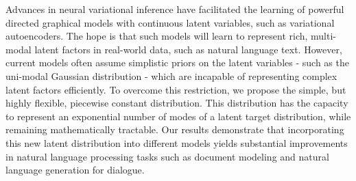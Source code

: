 Advances in neural variational inference have facilitated the learning of powerful directed graphical models with continuous latent variables, such as variational autoencoders. The hope is that such models will learn to represent rich, multi-modal latent factors in real-world data, such as natural language text. However, current models often assume simplistic priors on the latent variables - such as the uni-modal Gaussian distribution - which are incapable of representing complex latent factors efficiently. To overcome this restriction, we propose the simple, but highly flexible, piecewise constant distribution. This distribution has the capacity to represent an exponential number of modes of a latent target distribution, while remaining mathematically tractable. Our results demonstrate that incorporating this new latent distribution into different models yields substantial improvements in natural language processing tasks such as document modeling and natural language generation for dialogue.
